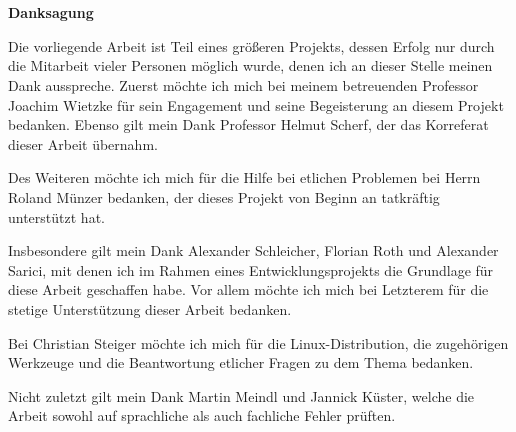 \pagestyle{scrheadings}            %
\chapter*{} \label{Danksagung}
\centerline{\Large \textsf{\textbf{Danksagung}}} %
\vspace{2ex}
Die vorliegende Arbeit ist Teil eines größeren Projekts, dessen Erfolg nur durch die Mitarbeit vieler Personen möglich wurde, denen ich an dieser Stelle meinen Dank ausspreche. Zuerst möchte ich mich bei meinem betreuenden Professor Joachim Wietzke für sein Engagement und seine Begeisterung an diesem Projekt bedanken. Ebenso gilt mein Dank Professor Helmut Scherf, der das Korreferat dieser Arbeit übernahm.

Des Weiteren möchte ich mich für die Hilfe bei etlichen Problemen bei Herrn Roland Münzer bedanken, der dieses Projekt von Beginn an tatkräftig unterstützt hat.

Insbesondere gilt mein Dank Alexander Schleicher, Florian Roth und Alexander Sarici, mit denen ich im Rahmen eines Entwicklungsprojekts die Grundlage für diese Arbeit geschaffen habe. Vor allem möchte ich mich bei Letzterem für die stetige Unterstützung dieser Arbeit bedanken.

Bei Christian Steiger möchte ich mich für die Linux-Distribution, die zugehörigen Werkzeuge und die Beantwortung etlicher Fragen zu dem Thema bedanken.

Nicht zuletzt gilt mein Dank Martin Meindl und Jannick Küster, welche die Arbeit sowohl auf sprachliche als auch fachliche Fehler prüften.




\cleardoublepage